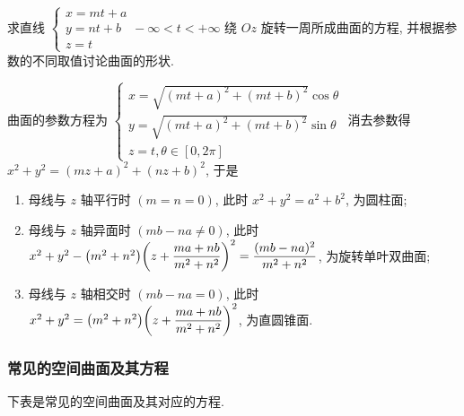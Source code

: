 \begin{example}
    求直线 $\begin{cases}
        x=mt+a\\
        y=nt+b\\
        z=t
    \end{cases}-\infty<t<+\infty$ 绕 $Oz$ 旋转一周所成曲面的方程, 并根据参数的不同取值讨论曲面的形状.
\end{example}
\begin{solution}
    曲面的参数方程为 $\begin{cases}
        x=\sqrt{(mt+a)^2+(mt+b)^2}\cos\theta\\
        y=\sqrt{(mt+a)^2+(mt+b)^2}\sin\theta\\
        z=t,\theta\in[0,2\pi]
    \end{cases}$
    消去参数得 $x^2+y^2=(mz+a)^2+(nz+b)^2$, 于是 
    \begin{enumerate}[label=(\arabic{*})]
        \item 母线与 $z$ 轴平行时 $(m=n=0)$, 此时 $x^2+y^2=a^2+b^2$, 为圆柱面;
        \item 母线与 $z$ 轴异面时 $(mb-na\neq0)$, 此时 $x^2+y^2-\qty(m^2+n^2)\qty(z+\dfrac{ma+nb}{m^2+n^2})^2=\dfrac{(mb-na)^2}{m^2+n^2}$, 为旋转单叶双曲面;
        \item 母线与 $z$ 轴相交时 $(mb-na=0)$, 此时 $x^2+y^2=\qty(m^2+n^2)\qty(z+\dfrac{ma+nb}{m^2+n^2})^2$, 为直圆锥面.
    \end{enumerate}
\end{solution}

\subsubsection{常见的空间曲面及其方程}

下表是常见的空间曲面及其对应的方程.

